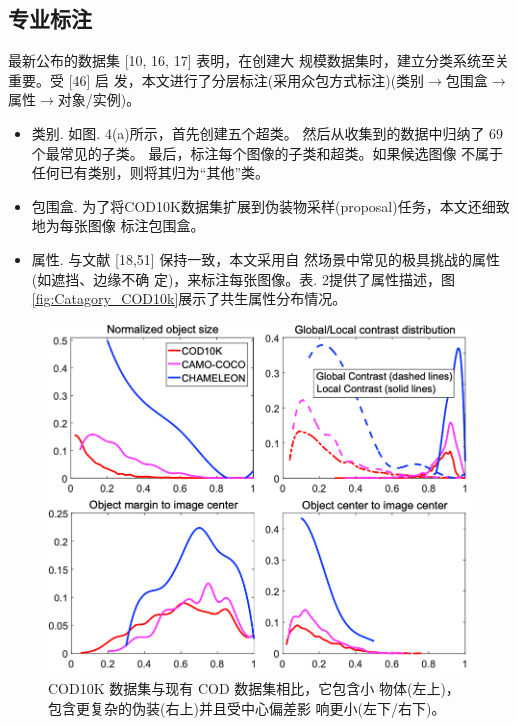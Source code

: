 \documentclass[final]{cvpr}
\renewcommand{\figref}[1]{图\ref{#1}}
\begin{document}
\subsection{专业标注}
最新公布的数据集 [10, 16, 17] 表明，在创建大 规模数据集时，建立分类系统至关重要。受 [46] 启 发，本文进行了分层标注(采用众包方式标注)(类别$\longrightarrow$包围盒$\longrightarrow$属性$\longrightarrow$对象/实例)。
\begin{itemize}
    \item 类别. 如图. 4(a)所示，首先创建五个超类。 然后从收集到的数据中归纳了 69 个最常见的子类。 最后，标注每个图像的子类和超类。如果候选图像 不属于任何已有类别，则将其归为“其他”类。
    \item 包围盒. 为了将COD10K数据集扩展到伪装物采样(proposal)任务，本文还细致地为每张图像 标注包围盒。
    \item 属性. 与文献 [18,51] 保持一致，本文采用自 然场景中常见的极具挑战的属性 (如遮挡、边缘不确 定)，来标注每张图像。表. 2提供了属性描述，\figref{fig:Catagory_COD10k}展示了共生属性分布情况。
\end{itemize}
\begin{figure}[tp]
    \centering
    \includegraphics[width=0.98\columnwidth]{COD_Zh_translate/figures/Graph_analyse_COD10k.png}\small
    \caption{ COD10K 数据集与现有 COD 数据集相比，它包含小 物体(左上)，包含更复杂的伪装(右上)并且受中心偏差影 响更小(左下/右下)。
}
    \label{fig:Graph_analyse_COD10k}
\end{figure}
\end{document}

